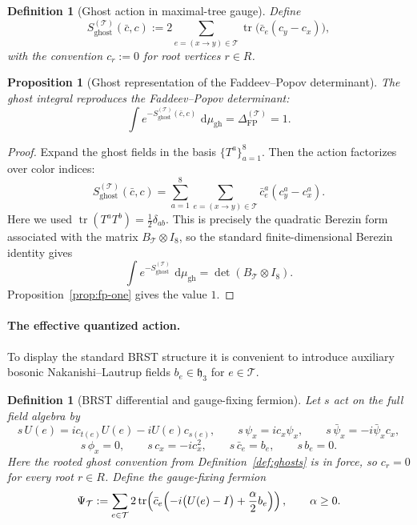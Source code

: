 \documentclass[11pt]{article}
\newtheorem{definition}[theorem]{Definition}
\newtheorem{proposition}[theorem]{Proposition}
\theoremstyle{remark}
\newcommand{\mcT}{\mathcal T}
\newcommand{\tr}{\operatorname{tr}}
\newcommand{\dd}{\,\mathrm d}
\newcommand{\mcHh}{\mathfrak h_3}
\begin{document}
\begin{definition}[Ghost action in maximal-tree gauge]
\label{def:ghost-action}
Define
\[
S_{\mathrm{ghost}}^{(\mcT)}(\bar c,c)
:=
2\sum_{e=(x\to y)\in\mcT}\tr\!\bigl(\bar c_e(c_y-c_x)\bigr),
\]
with the convention $c_r:=0$ for root vertices $r\in R$.
\end{definition}

\begin{proposition}[Ghost representation of the Faddeev--Popov determinant]
\label{prop:ghost-det}
The ghost integral reproduces the Faddeev--Popov determinant:
\[
\int e^{-S_{\mathrm{ghost}}^{(\mcT)}(\bar c,c)}\,\dd\mu_{\mathrm{gh}}
=\Delta_{\mathrm{FP}}^{(\mcT)}=1.
\]
\end{proposition}
\begin{proof}
Expand the ghost fields in the basis $\{T^a\}_{a=1}^8$.  Then the action
factorizes over color indices:
\[
S_{\mathrm{ghost}}^{(\mcT)}(\bar c,c)
=
\sum_{a=1}^8\sum_{e=(x\to y)\in\mcT}
\bar c_e^a(c_y^a-c_x^a).
\]
Here we used $\tr(T^aT^b)=\frac12\delta_{ab}$.
This is precisely the quadratic Berezin form associated with the matrix
$B_{\mcT}\otimes I_8$, so the standard finite-dimensional Berezin identity gives
\[
\int e^{-S_{\mathrm{ghost}}^{(\mcT)}}\,\dd\mu_{\mathrm{gh}}
=
\det(B_{\mcT}\otimes I_8).
\]
Proposition~\ref{prop:fp-one} gives the value $1$.
\end{proof}

\paragraph{The effective quantized action.}
To display the standard BRST structure it is convenient to introduce auxiliary
bosonic Nakanishi--Lautrup fields $b_e\in\mcHh$ for $e\in\mcT$.

\begin{definition}[BRST differential and gauge-fixing fermion]
\label{def:brst}
Let $s$ act on the full field algebra by
\[
s\,U(e)=i c_{t(e)}U(e)-iU(e)c_{s(e)},
\qquad
s\,\psi_x=i c_x\psi_x,
\qquad
s\,\bar\psi_x=-i\bar\psi_x c_x,
\]
\[
s\,\phi_x=0,
\qquad
s\,c_x=-i c_x^2,
\qquad
s\,\bar c_e=b_e,
\qquad
s\,b_e=0.
\]
Here the rooted ghost convention from Definition~\ref{def:ghosts} is in force,
so $c_r=0$ for every root $r\in R$.
Define the gauge-fixing fermion
\[
\Psi_{\mcT}
:=
\sum_{e\in\mcT}
2\tr\!\left(\bar c_e\Bigl(-i\bigl(U(e)-I\bigr)+\frac{\alpha}{2}b_e\Bigr)\right),
\qquad \alpha\ge 0.
\]
\end{definition}
\end{document}
